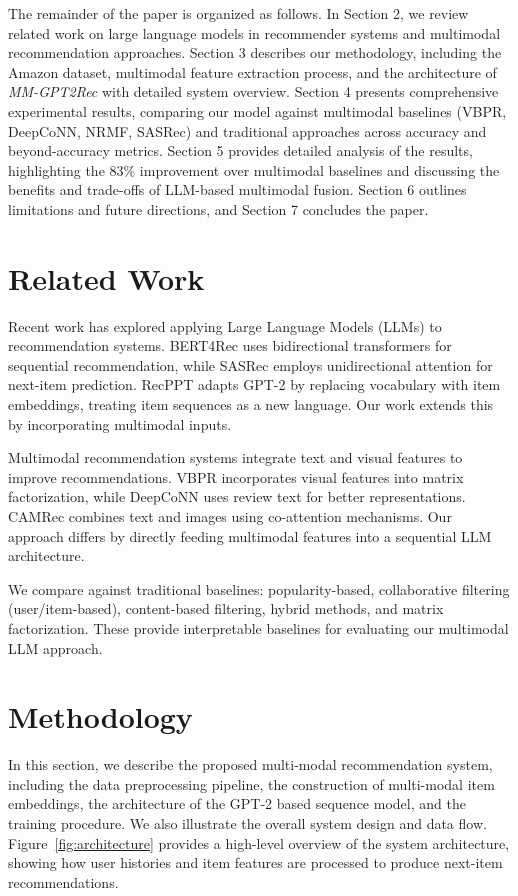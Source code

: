 \documentclass[conference]{IEEEtran}
\begin{document}
The remainder of the paper is organized as follows. In Section 2, we review related work on large language models in recommender systems and multimodal recommendation approaches. Section 3 describes our methodology, including the Amazon dataset, multimodal feature extraction process, and the architecture of \textit{MM-GPT2Rec} with detailed system overview. Section 4 presents comprehensive experimental results, comparing our model against multimodal baselines (VBPR, DeepCoNN, NRMF, SASRec) and traditional approaches across accuracy and beyond-accuracy metrics. Section 5 provides detailed analysis of the results, highlighting the 83\% improvement over multimodal baselines and discussing the benefits and trade-offs of LLM-based multimodal fusion. Section 6 outlines limitations and future directions, and Section 7 concludes the paper.




\section{Related Work}
Recent work has explored applying Large Language Models (LLMs) to recommendation systems. BERT4Rec uses bidirectional transformers for sequential recommendation, while SASRec employs unidirectional attention for next-item prediction. RecPPT adapts GPT-2 by replacing vocabulary with item embeddings, treating item sequences as a new language. Our work extends this by incorporating multimodal inputs.

Multimodal recommendation systems integrate text and visual features to improve recommendations. VBPR incorporates visual features into matrix factorization, while DeepCoNN uses review text for better representations. CAMRec combines text and images using co-attention mechanisms. Our approach differs by directly feeding multimodal features into a sequential LLM architecture.

We compare against traditional baselines: popularity-based, collaborative filtering (user/item-based), content-based filtering, hybrid methods, and matrix factorization. These provide interpretable baselines for evaluating our multimodal LLM approach.



\section{Methodology}

In this section, we describe the proposed multi-modal recommendation system, including the data preprocessing pipeline, the construction of multi-modal item embeddings, the architecture of the GPT-2 based sequence model, and the training procedure. We also illustrate the overall system design and data flow. Figure~\ref{fig:architecture} provides a high-level overview of the system architecture, showing how user histories and item features are processed to produce next-item recommendations.
\end{document}
